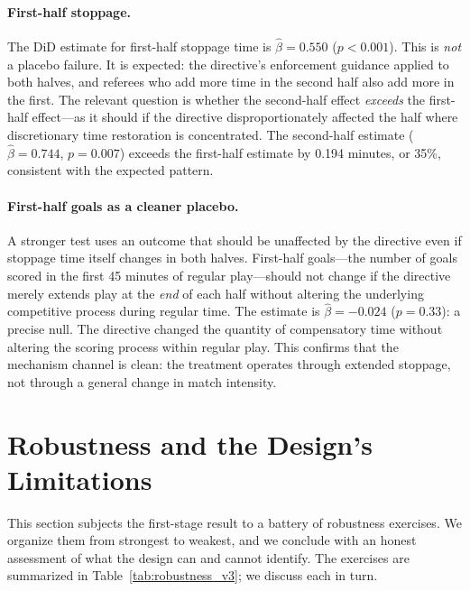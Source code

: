 \paragraph{First-half stoppage.} The DiD estimate for first-half stoppage time is $\hat{\beta} = 0.550$ ($p < 0.001$). This is \textit{not} a placebo failure. It is expected: the directive's enforcement guidance applied to both halves, and referees who add more time in the second half also add more in the first. The relevant question is whether the second-half effect \textit{exceeds} the first-half effect---as it should if the directive disproportionately affected the half where discretionary time restoration is concentrated. The second-half estimate ($\hat{\beta} = 0.744$, $p = 0.007$) exceeds the first-half estimate by 0.194 minutes, or 35\%, consistent with the expected pattern.

\paragraph{First-half goals as a cleaner placebo.} A stronger test uses an outcome that should be unaffected by the directive even if stoppage time itself changes in both halves. First-half goals---the number of goals scored in the first 45 minutes of regular play---should not change if the directive merely extends play at the \textit{end} of each half without altering the underlying competitive process during regular time. The estimate is $\hat{\beta} = -0.024$ ($p = 0.33$): a precise null. The directive changed the quantity of compensatory time without altering the scoring process within regular play. This confirms that the mechanism channel is clean: the treatment operates through extended stoppage, not through a general change in match intensity.


\section{Robustness and the Design's Limitations}
\label{sec:robustness}

This section subjects the first-stage result to a battery of robustness exercises. We organize them from strongest to weakest, and we conclude with an honest assessment of what the design can and cannot identify. The exercises are summarized in Table~\ref{tab:robustness_v3}; we discuss each in turn.

